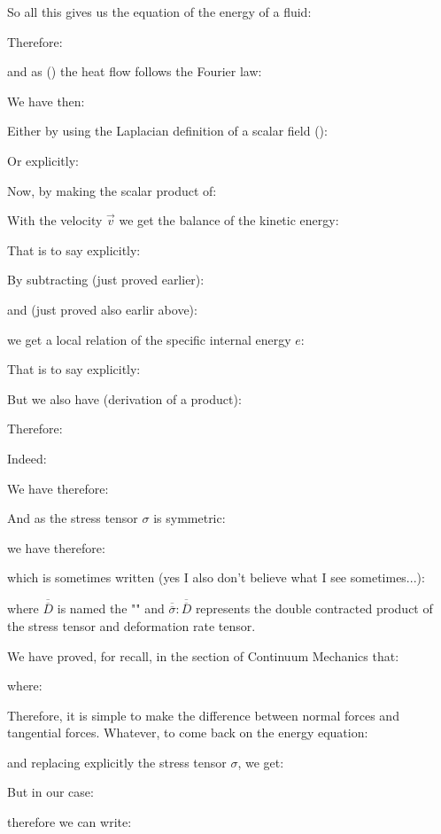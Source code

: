 	So all this gives us the equation of the energy of a fluid:
	
	Therefore:
	
	and as () the heat flow follows the Fourier law:
	
	We have then:
	
	Either by using the Laplacian definition of a scalar field ():
	
	Or explicitly:
	
	Now, by making the scalar product of:
	
	With the velocity $\vec{v}$ we get the balance of the kinetic energy:
	
	That is to say explicitly:
	
	By subtracting (just proved earlier): 
	
	and (just proved also earlir above):
	
	we get a local relation of the specific internal energy $e$:
	
	That is to say explicitly:
	
	But we also have (derivation of a product):
	
	Therefore:
	
	Indeed:
	
	We have therefore:
	
	And as the stress tensor $\sigma$ is symmetric:
	
	we have therefore:
	
	which is sometimes written (yes I also don't believe what I see sometimes...):
	
	where $\overline{\overline{D}}$ is named the "" and $\overline{\overline{\sigma}} : \overline{\overline{D}}$ represents the double contracted product of the stress tensor and deformation rate tensor.

	We have proved, for recall, in the section of Continuum Mechanics that:
	
	where:
	
	Therefore, it is simple to make the difference between normal forces and tangential forces. Whatever, to come back on the energy equation:
	
	and replacing explicitly the stress tensor $\sigma$, we get:
	
	But in our case:
	
	therefore we can write:
	

